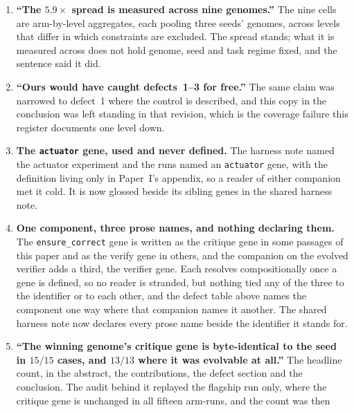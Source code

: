 \documentclass[11pt]{article}
\begin{document}
\begin{enumerate}
    control runs to this day with \texttt{module\_selector} at GEPA's default and no verify-truth
    signal, and returns $+1.000$ anyway, so it does not fail under defects~2 or~3; its reflection
    function also returns the same proposal whatever records it is shown. The claim is narrowed to
    defect~1, and the control's use of one task set as both train and held-out is now disclosed.
  \item \textbf{``The $5.9\times$ spread is measured across nine genomes.''} The nine cells are
    arm-by-level aggregates, each pooling three seeds' genomes, across levels that differ in which
    constraints are excluded. The spread stands; what it is measured across does not hold genome,
    seed and task regime fixed, and the sentence said it did.
  \item \textbf{``Ours would have caught defects~1--3 for free.''} The same claim was narrowed
    to defect~1 where the control is described, and this copy in the conclusion was left standing
    in that revision, which is the coverage failure this register documents one level down.
  \item \textbf{The \texttt{actuator} gene, used and never defined.} The harness note named the
    actuator experiment and the runs named an \texttt{actuator} gene, with the definition living
    only in Paper~I's appendix, so a reader of either companion met it cold. It is now glossed
    beside its sibling genes in the shared harness note.
  \item \textbf{One component, three prose names, and nothing declaring them.} The
    \texttt{ensure\_correct} gene is written as the critique gene in some passages of this
    paper and as the verify gene in others, and the companion on the evolved verifier adds a
    third, the verifier gene. Each resolves compositionally once a gene is defined, so no
    reader is stranded, but nothing tied any of the three to the identifier or to each other,
    and the defect table above names the component one way where that companion names it
    another. The shared harness note now declares every prose name beside the identifier it
    stands for.
  \item \textbf{``The winning genome's critique gene is byte-identical to the seed in $15/15$ cases, and
    $13/13$ where it was evolvable at all.''} The headline count, in the abstract, the
    contributions, the defect section and the conclusion. The audit behind it replayed the flagship
    run only, where the critique gene is unchanged in all fifteen arm-runs, and the count was then

\end{enumerate}
\end{document}
